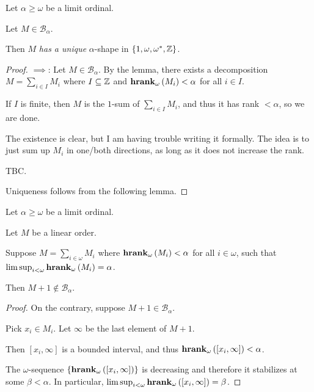 \begin{lemma}
  Let $\alpha \ge \omega$ be a limit ordinal.

  Let $M \in \mathcal{B}_{\alpha}$.
  
  Then $M$ \emph{has a unique} $\alpha$-shape in $\left\{ {1, \omega, \omega^\ast, \mathbb{Z}} \right\}$.
\end{lemma}

\begin{proof}
  $\implies$: Let $M \in \mathcal{B}_{\alpha}$. By the lemma,
  there exists a decomposition $M = \sum_{i \in I} M_i$ where
  $I \subseteq \mathbb{Z}$ and $\mathbf{hrank}_{\omega}\left( M_i \right) < \alpha$ for all $i \in I$.

  If $I$ is finite, then $M$ is the $1$-sum of $\sum_{i \in I} M_i$,
  and thus it has rank $< \alpha$, so we are done.

  The existence is clear, but I am having trouble writing
  it formally. The idea is to just sum up $M_i$ in one/both directions,
  as long as it does not increase the rank.

  TBC.

  Uniqueness follows from the following lemma.
\end{proof}

\begin{lemma}
  Let $\alpha \ge \omega$ be a limit ordinal.

  Let $M$ be a linear order.
  
  Suppose $M = \sum_{i \in \omega} M_i$
  where $\mathbf{hrank}_{\omega}\left( M_i \right) < \alpha$ for all $i \in \omega$,
  such that $\limsup_{i < \omega}{\mathbf{hrank}_{\omega}\left( M_i \right)} = \alpha$.

  Then $M + 1 \notin \mathcal{B}_{\alpha}$.
\end{lemma}

\begin{proof}
  On the contrary, suppose $M + 1 \in \mathcal{B}_{\alpha}$.
  
  Pick $x_i \in M_i$. Let $\infty$ be the last element of $M + 1$.

  Then $[x_i, \infty]$ is a bounded interval, and thus
  $\mathbf{hrank}_{\omega}\left( [x_i, \infty] \right) < \alpha$.

  The $\omega$-sequence $\left\{ {\mathbf{hrank}_{\omega}\left( [x_i, \infty] \right)} \right\}$
  is decreasing and therefore it stabilizes at some $\beta < \alpha$.
  In particular, $\limsup_{i < \omega}{\mathbf{hrank}_{\omega}\left( [x_i, \infty] \right)} = \beta$.
\end{proof}

